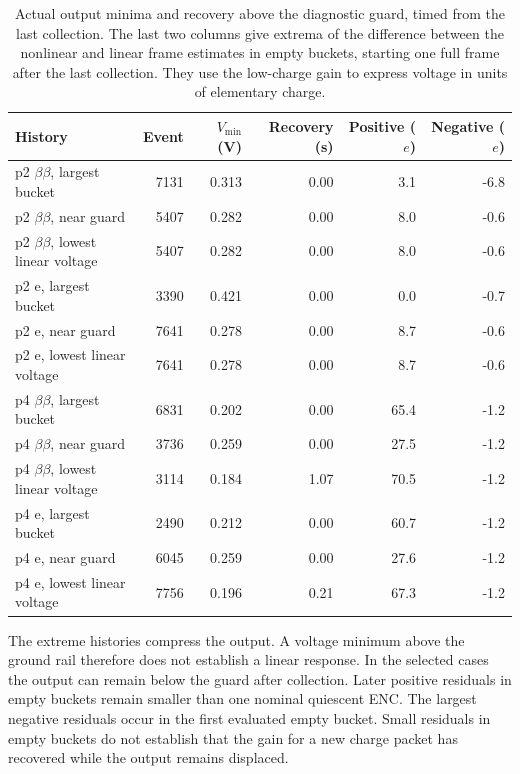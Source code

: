 \documentclass[11pt,a4paper]{article}
\begin{document}
\begin{table}[ht]\centering\scriptsize
\begin{tabular}{lrrrrr}\toprule
History & Event & $V_{\min}$ (V) & Recovery (s) & Positive ($e$) & Negative ($e$)\\\midrule
p2 $\beta\beta$, largest bucket & 7131 & 0.313 & 0.00 & 3.1 & -6.8 \\
p2 $\beta\beta$, near guard & 5407 & 0.282 & 0.00 & 8.0 & -0.6 \\
p2 $\beta\beta$, lowest linear voltage & 5407 & 0.282 & 0.00 & 8.0 & -0.6 \\
p2 e, largest bucket & 3390 & 0.421 & 0.00 & 0.0 & -0.7 \\
p2 e, near guard & 7641 & 0.278 & 0.00 & 8.7 & -0.6 \\
p2 e, lowest linear voltage & 7641 & 0.278 & 0.00 & 8.7 & -0.6 \\
p4 $\beta\beta$, largest bucket & 6831 & 0.202 & 0.00 & 65.4 & -1.2 \\
p4 $\beta\beta$, near guard & 3736 & 0.259 & 0.00 & 27.5 & -1.2 \\
p4 $\beta\beta$, lowest linear voltage & 3114 & 0.184 & 1.07 & 70.5 & -1.2 \\
p4 e, largest bucket & 2490 & 0.212 & 0.00 & 60.7 & -1.2 \\
p4 e, near guard & 6045 & 0.259 & 0.00 & 27.6 & -1.2 \\
p4 e, lowest linear voltage & 7756 & 0.196 & 0.21 & 67.3 & -1.2 \\
\bottomrule\end{tabular}
\caption{Actual output minima and recovery above the diagnostic guard, timed
from the last collection. The last two columns give extrema of the difference
between the nonlinear and linear frame estimates in empty buckets, starting one
full frame after the last collection. They use the low-charge gain to express
voltage in units of elementary charge.}
\end{table}

The extreme histories compress the output. A voltage minimum above the ground
rail therefore does not establish a linear response. In the selected cases the
output can remain below the guard after collection. Later positive residuals in
empty buckets remain smaller than one nominal quiescent ENC. The largest
negative residuals occur in the first evaluated empty bucket. Small residuals
in empty buckets do not establish that the gain for a new charge packet has
recovered while the output remains displaced.
\end{document}
